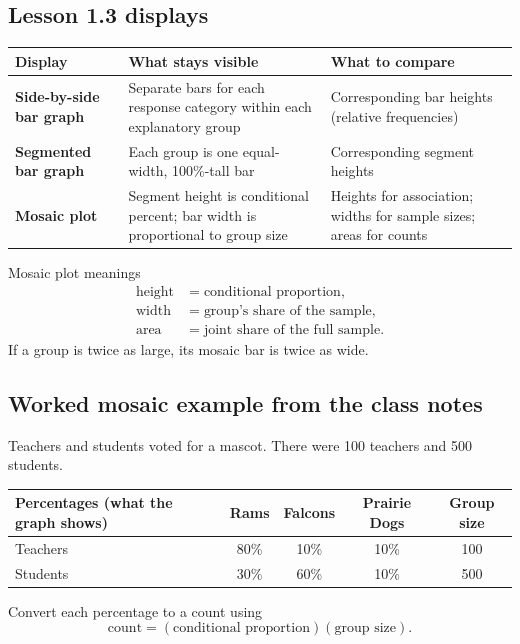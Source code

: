 \documentclass[11pt]{article}
\begin{document}
\subsection{Lesson 1.3 displays}
\begin{tabularx}{\textwidth}{>{\bfseries\color{Navy}}p{1.5in} Y Y}
\toprule
Display & What stays visible & What to compare\\
\midrule
Side-by-side bar graph & Separate bars for each response category within each explanatory group & Corresponding bar heights (relative frequencies)\\
Segmented bar graph & Each group is one equal-width, 100\%-tall bar & Corresponding segment heights\\
Mosaic plot & Segment height is conditional percent; bar width is proportional to group size & Heights for association; widths for sample sizes; areas for counts\\
\bottomrule
\end{tabularx}

\begin{formulabox}{Mosaic plot meanings}
\begin{align*}
\text{height}&=\text{conditional proportion},\\
\text{width}&=\text{group's share of the sample},\\
\text{area}&=\text{joint share of the full sample}.
\end{align*}
If a group is twice as large, its mosaic bar is twice as wide.
\end{formulabox}

\subsection{Worked mosaic example from the class notes}
Teachers and students voted for a mascot. There were 100 teachers and 500 students.

\begin{center}
\begin{tabular}{l|ccc|c}
Percentages (what the graph shows) & Rams & Falcons & Prairie Dogs & Group size\\ \hline
Teachers & 80\% & 10\% & 10\% & 100\\
Students & 30\% & 60\% & 10\% & 500\\
\end{tabular}
\end{center}

Convert each percentage to a count using
\[
\text{count}=(\text{conditional proportion})(\text{group size}).
\]
\end{document}
